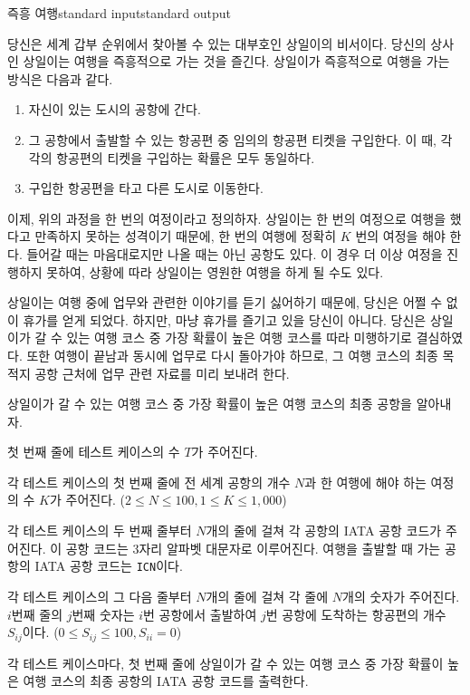 \begin{problem}{즉흥 여행}{standard input}{standard output}

당신은 세계 갑부 순위에서 찾아볼 수 있는 대부호인 상일이의 비서이다. 
당신의 상사인 상일이는 여행을 즉흥적으로 가는 것을 즐긴다. 
상일이가 즉흥적으로 여행을 가는 방식은 다음과 같다.

\begin{enumerate}
\item{자신이 있는 도시의 공항에 간다.}
\item{그 공항에서 출발할 수 있는 항공편 중 임의의 항공편 티켓을 구입한다. 이 때, 각각의 항공편의 티켓을 구입하는 확률은 모두 동일하다.}
\item{구입한 항공편을 타고 다른 도시로 이동한다.}
\end{enumerate}

이제, 위의 과정을 한 번의 여정이라고 정의하자. 
상일이는 한 번의 여정으로 여행을 했다고 만족하지 못하는 성격이기 때문에, 한 번의 여행에 정확히 $K$ 번의 여정을 해야 한다.
들어갈 때는 마음대로지만 나올 때는 아닌 공항도 있다. 
이 경우 더 이상 여정을 진행하지 못하여, 상황에 따라 상일이는 영원한 여행을 하게 될 수도 있다. 

상일이는 여행 중에 업무와 관련한 이야기를 듣기 싫어하기 때문에, 당신은 어쩔 수 없이 휴가를 얻게 되었다. 
하지만, 마냥 휴가를 즐기고 있을 당신이 아니다. 
당신은 상일이가 갈 수 있는 여행 코스 중 가장 확률이 높은 여행 코스를 따라 미행하기로 결심하였다. 
또한 여행이 끝남과 동시에 업무로 다시 돌아가야 하므로, 그 여행 코스의 최종 목적지 공항 근처에 업무 관련 자료를 미리 보내려 한다.

상일이가 갈 수 있는 여행 코스 중 가장 확률이 높은 여행 코스의 최종 공항을 알아내자.


\InputFile
첫 번째 줄에 테스트 케이스의 수 $T$가 주어진다.

각 테스트 케이스의 첫 번째 줄에 전 세계 공항의 개수 $N$과 한 여행에 해야 하는 여정의 수 $K$가 주어진다. ($2 \le N \le 100, 1 \le K \le 1,000$)

각 테스트 케이스의 두 번째 줄부터 $N$개의 줄에 걸쳐 각 공항의 IATA 공항 코드가 주어진다. 
이 공항 코드는 3자리 알파벳 대문자로 이루어진다. 
여행을 출발할 때 가는 공항의 IATA 공항 코드는 \texttt{ICN}이다.

각 테스트 케이스의 그 다음 줄부터 $N$개의 줄에 걸쳐 각 줄에 $N$개의 숫자가 주어진다. 
$i$번째 줄의 $j$번째 숫자는 $i$번 공항에서 출발하여 $j$번 공항에 도착하는 항공편의 개수 $S_{ij}$이다. ($0 \le S_{ij} \le 100, S_{ii} = 0$)

\OutputFile
각 테스트 케이스마다, 첫 번째 줄에 상일이가 갈 수 있는 여행 코스 중 가장 확률이 높은 여행 코스의 최종 공항의 IATA 공항 코드를 출력한다.


\end{problem}
